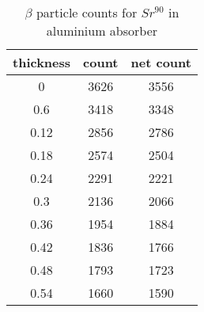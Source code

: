 \begin{table}[H]
    \centering
    \begin{tabular}{|c|c|c|}
        \hline
        thickness & count & net count \\ \hline
        0         & 3626  & 3556      \\ \hline
        0.6       & 3418  & 3348      \\ \hline
        0.12      & 2856  & 2786      \\ \hline
        0.18      & 2574  & 2504      \\ \hline
        0.24      & 2291  & 2221      \\ \hline
        0.3       & 2136  & 2066      \\ \hline
        0.36      & 1954  & 1884      \\ \hline
        0.42      & 1836  & 1766      \\ \hline
        0.48      & 1793  & 1723      \\ \hline
        0.54      & 1660  & 1590      \\ \hline
    \end{tabular}
    \label{tab:3}
    \caption{$\beta$ particle counts for $Sr^{90}$ in aluminium absorber}
\end{table}